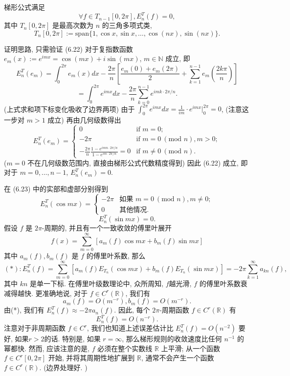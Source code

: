 \documentclass[a4paper]{ctexart}
\newcommand{\hl}[1]
{\noindent {\bf {#1}}}
\begin{document}
{\hl{引理 6.21} 梯形公式满足
$$ 
\forall f \in T_{n-1}[0, 2\pi], E^T_n(f) = 0, 
$$
其中 $T_n[0, 2\pi]$ 是最高次数为 $n$ 的三角多项式类, 
$$ 
T_n[0, 2\pi] := \text{span}\{1, \cos x, \sin x, \ldots, \cos(nx), \sin(nx)\}. 
$$

证明思路, 只需验证 (6.22) 对于复指数函数 $e_m(x) := e^{imx} = \cos(mx) + i\sin(mx)$, 
$m \in \mathbb{N}$ 成立, 即
$$
E^T_n(e_m) = \int_{0}^{2\pi} e_m(x)dx 
- \frac{2\pi}{n} \left[ \frac{e_m(0) + e_m(2\pi)}{2} 
+ \sum_{k=1}^{n-1} e_m\left(\frac{2k\pi}{n}\right) \right]
$$
$$
= \int_{0}^{2\pi} e^{imx}dx - \frac{2\pi}{n} \sum_{k=0}^{n-1} e^{imk\cdot2\pi/n}.
$$
(上式求和项下标变化吸收了边界两项) 由于 
$\int_{0}^{2\pi} e^{imx}dx = \frac{1}{im} \cdot e^{imx} \bigg|_{0}^{2\pi} = 0$, 
(注意这一步对 $m > 1$ 成立) 再由几何级数得出
$$
E^T_n(e_m) =
\begin{cases}
0 & \text{if } m = 0; \\
-2\pi & \text{if } m = 0 \ (\text{mod } n), m > 0; \\
-\frac{2\pi}{n} \frac{1-e^{imn\cdot2\pi/n}}{1-e^{im\cdot2\pi/n}} = 0 & \text{if } m \neq 0 \ (\text{mod } n).
\end{cases}
$$
($m = 0$ 不在几何级数范围内, 直接由梯形公式代数精度得到)
因此 (6.22) 成立, 即对于 $m = 0, \ldots, n - 1$, $E^T_n(e_m) = 0$. 

在 (6.23) 中的实部和虚部分别得到
$$
E^T_n(\cos mx) =
\begin{cases}
-2\pi & \text{如果 } m = 0 \ (\text{mod } n), m \neq 0; \\
0 & \text{其他情况.}
\end{cases}
$$
$$
E^T_n(\sin mx) = 0.
$$
假设 $f$ 是 $2\pi$-周期的, 并且有一个一致收敛的傅里叶展开
$$
f(x) = \sum_{m=0}^{\infty} [a_m(f) \cos mx + b_m(f) \sin mx]
$$
其中 $a_m(f), b_m(f)$ 是 $f$ 的傅里叶系数, 那么
$$
(*) : 
E^T_n(f) = \sum_{m=0}^{\infty} 
[a_m(f)E_{T_n}(\cos mx) + b_m(f)E_{T_n}(\sin mx)] 
= -2\pi \sum_{k=1}^{\infty} a_{kn}(f),
$$
其中 $kn$ 是单一下标. 在傅里叶级数理论中, 众所周知, $f$越光滑, 
$f$ 的傅里叶系数衰减得越快. 更准确地说, 对于 $f \in C^r(\mathbb{R})$, 
我们有
$$
a_m(f) = O(m^{-r}), b_m(f) = O(m^{-r}).
$$
由(*), 我们有 $E^T_n(f) \approx -2\pi a_n(f)$. 
因此, 每个 $2\pi$-周期函数 $f \in C^r(\mathbb{R})$ 有
$$
E^T_n(f) = O(n^{-r}).
$$
注意对于非周期函数 $f \in C^r$, 我们也知道上述误差估计比 $E^T_n(f) = O(n^{-2})$ 要好, 
如果$r > 2$的话. 特别是, 如果 $r = \infty$, 那么梯形规则的收敛速度比任何 
$n^{-1}$ 的幂都快. 然而, 应该注意的是, $f$ 必须在整个实数线 $\mathbb{R}$ 上平滑;
从一个函数 $f \in C^r[0, 2\pi]$ 开始, 并将其周期性地扩展到 $\mathbb{R}$, 
通常不会产生一个函数 $f \in C^r(\mathbb{R})$. (边界处理好. )


}
\end{document}

